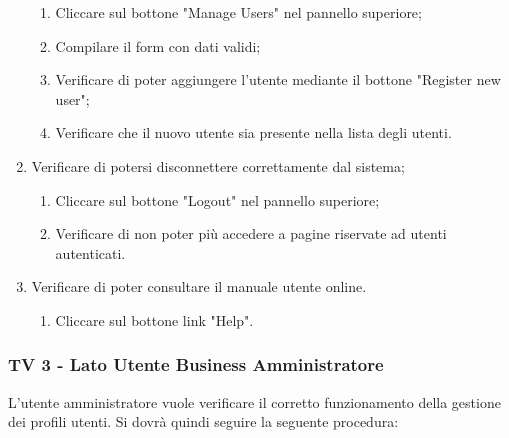 \begin{enumerate}
\begin{enumerate}
\item Cliccare sul bottone "Manage Users" nel pannello superiore;
\item Compilare il form con dati validi;
\item Verificare di poter aggiungere l'utente mediante il bottone "Register new user";
\item Verificare che il nuovo utente sia presente nella lista degli utenti. 
\end{enumerate}
\item Verificare di potersi disconnettere correttamente dal sistema;
\begin{enumerate}
\item Cliccare sul bottone "Logout" nel pannello superiore;
\item Verificare di non poter più accedere a pagine riservate ad utenti autenticati.
\end{enumerate}
\item Verificare di poter consultare il manuale utente online.
\begin{enumerate}
\item Cliccare sul bottone link "Help".
\end{enumerate}

\end{enumerate}

\subsubsection{TV 3 - Lato Utente Business Amministratore}

L'utente amministratore vuole verificare il corretto funzionamento della gestione dei profili utenti.
Si dovrà quindi seguire la seguente procedura:

